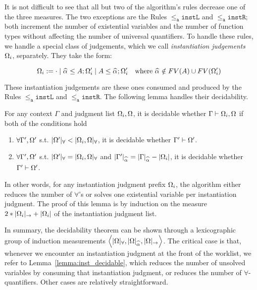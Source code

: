 It is not difficult to see that all but two of the algorithm's rules decrease
one of the three measures. The two exceptions are the Rules $\mathtt{{\le_a}instL}$ and $\mathtt{{\le_a}instR}$; both increment the number of existential
variables and the number of function types without affecting the number of
universal quantifiers.
To handle these rules, we handle a special class of judgements, which
we call \emph{instantiation judgements} $\exps_i$, separately. They 
take the form:
\begin{definition}[$\exps_i$]
$$\exps_i := \cdot \mid \jcons{\al\le A}{\exps_i'} \mid \jcons{A\le \al}{\exps_i'}
\quad\text{where } \al\notin FV(A)\cup FV(\exps_i')$$
\end{definition}
These instantiation judgements are these ones consumed and
produced by the Rules $\mathtt{{\le_a}instL}$ and $\mathtt{{\le_a}instR}$.
The following lemma handles their decidability.
\begin{lemma}
	For any context $\Gamma$ and judgment list $\Omega_i, \Omega$, it is decidable whether $\Gamma\vdash \Omega_i,\Omega$ if both of the conditions hold
\begin{enumerate}[1)]
	\item $\forall \Gamma', \Omega'$ s.t. $|\Omega'|_\forall < |\Omega_i,\Omega|_\forall$, it is decidable whether $\Gamma'\vdash \Omega'$.
	\item $\forall \Gamma', \Omega'$ s.t. $|\Omega'|_\forall = |\Omega_i,\Omega|_\forall$ and $|\Gamma'|_{\al} = |\Gamma|_{\al} - |\exps_i|$, it is decidable whether $\Gamma'\vdash \Omega'$.
\end{enumerate}
\label{lemma:inst_decidable}
\end{lemma}
In other words, for any instantiation judgment prefix $\exps_i$, the algorithm
either reduces the number of $\forall$'s or solves one existential variable per
instantiation judgment. The proof of this lemma is by induction on the measure
$2*|\Omega_i|_{\to} + |\Omega_i|$ of the instantiation judgment list.

In summary, the decidability theorem can be shown through a lexicographic group
of induction measurements $\left\langle|\Omega|_\forall, |\Omega|_{\al},
|\Omega|_\to\right\rangle$. The critical case is that, whenever we
encounter an instantiation judgment at the front of the worklist, we refer to
Lemma~\ref{lemma:inst_decidable}, which reduces the number of unsolved
variables by consuming that instantiation judgment, or reduces the number of
$\forall$-quantifiers. Other cases are relatively straightforward.
